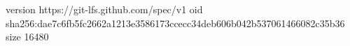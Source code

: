 version https://git-lfs.github.com/spec/v1
oid sha256:dae7c6fb5fc2662a1213e3586173ccecc34deb606b042b537061466082c35b36
size 16480
